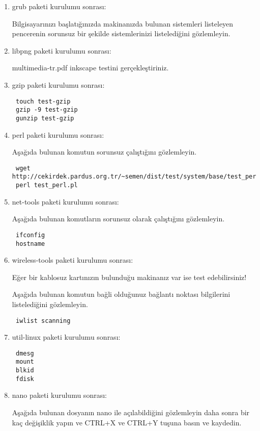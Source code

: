 \documentclass[a4paper,10pt]{article}
\begin{document}
\begin{enumerate}
\item grub paketi kurulumu sonrası:

Bilgisayarınızı başlatığınızda makinanızda bulunan sistemleri listeleyen pencerenin sorunsuz bir şekilde sistemlerinizi listelediğini gözlemleyin. 

\item libpng paketi kurulumu sonrası:

multimedia-tr.pdf inkscape testini gerçekleştiriniz.

\item gzip paketi kurulumu sonrası:
\begin{verbatim}
 touch test-gzip
 gzip -9 test-gzip
 gunzip test-gzip 
\end{verbatim}


\item perl paketi kurulumu sonrası:

Aşağıda bulunan komutun sorunsuz çalıştığını gözlemleyin.
\begin{verbatim}
 wget http://cekirdek.pardus.org.tr/~semen/dist/test/system/base/test_perl.pl
 perl test_perl.pl
\end{verbatim}

\item net-tools paketi kurulumu sonrası:

Aşağıda bulunan komutların sorunsuz olarak çalıştığını gözlemleyin.
\begin{verbatim}
 ifconfig
 hostname
\end{verbatim}


\item wireless-tools paketi kurulumu sonrası:

Eğer bir kablosuz kartınızın bulunduğu makinanız var ise test edebilirsiniz!

Aşağıda bulunan komutun bağli olduğunuz bağlantı noktası bilgilerini listelediğini gözlemleyin.
\begin{verbatim}
 iwlist scanning
\end{verbatim}


\item util-linux paketi kurulumu sonrası:
\begin{verbatim}
 dmesg
 mount 
 blkid
 fdisk
\end{verbatim}

\item nano paketi kurulumu sonrası:

Aşağıda bulunan dosyanın nano ile açılabildiğini gözlemleyin daha sonra bir kaç değişiklik yapın ve CTRL+X ve CTRL+Y tuşuna basın ve kaydedin. 


\end{enumerate}
\end{document}
